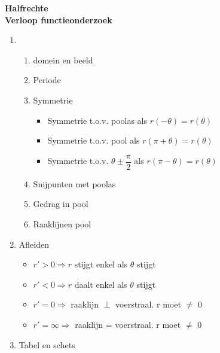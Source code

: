 \documentclass[12pt]{report}
\newcommand{\important}[1] {\textbf{\color{orange}#1}}
\begin{document}
\important{Halfrechte}
\\
\important{Verloop functieonderzoek}
\begin{enumerate}
 \item \begin{enumerate}
        \item domein en beeld
        \item Periode
        \item Symmetrie
        \begin{itemize}
         \item Symmetrie t.o.v. poolas als $r(-\theta) = r(\theta)$
         \item Symmetrie t.o.v. pool als $r(\pi + \theta) = r(\theta)$
         \item Symmetrie t.o.v. $\theta \pm \dfrac{\pi}{2}$ als $r(\pi - \theta) = r(\theta)$
        \end{itemize}

        \item Snijpunten met poolas
        \item Gedrag in pool
        \item Raaklijnen pool
       \end{enumerate}
 \item Afleiden
 \begin{itemize}
  \item $r' > 0 \Rightarrow r $ stijgt enkel als $\theta$ stijgt
  \item $r' < 0 \Rightarrow r $ daalt enkel als $\theta$ stijgt
  \item $r' = 0 \Rightarrow $ raaklijn $\perp$ voerstraal. r moet $\neq$ 0 
  \item $r' = \infty \Rightarrow $ raaklijn = voerstraal. r moet $\neq$ 0
 \end{itemize}

 \item Tabel en schets

\end{enumerate}




  
\end{document}
